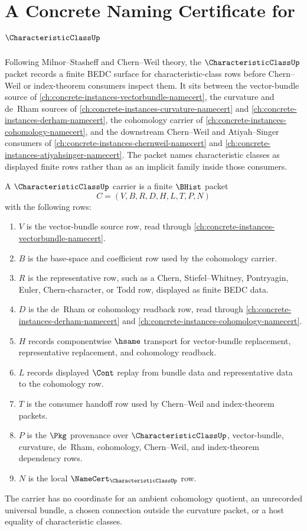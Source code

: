 \chapter{A Concrete Naming Certificate for $\CharacteristicClassUp$}
\label{ch:concrete-instances-characteristic-class-namecert}

Following Milnor--Stasheff and Chern--Weil theory, the $\CharacteristicClassUp$ packet records a finite BEDC surface for characteristic-class rows before Chern--Weil or index-theorem consumers inspect them. It sits between the vector-bundle source of \autoref{ch:concrete-instances-vectorbundle-namecert}, the curvature and de~Rham sources of \autoref{ch:concrete-instances-curvature-namecert} and \autoref{ch:concrete-instances-derham-namecert}, the cohomology carrier of \autoref{ch:concrete-instances-cohomology-namecert}, and the downstream Chern--Weil and Atiyah--Singer consumers of \autoref{ch:concrete-instances-chernweil-namecert} and \autoref{ch:concrete-instances-atiyahsinger-namecert}. The packet names characteristic classes as displayed finite rows rather than as an implicit family inside those consumers.

\begin{definition}
\label{def:characteristic-class-carrier}
A $\CharacteristicClassUp$ carrier is a finite $\BHist$ packet
$$
C=(V,B,R,D,H,L,T,P,N)
$$
with the following rows:
\begin{enumerate}
\item $V$ is the vector-bundle source row, read through \autoref{ch:concrete-instances-vectorbundle-namecert}.
\item $B$ is the base-space and coefficient row used by the cohomology carrier.
\item $R$ is the representative row, such as a Chern, Stiefel--Whitney, Pontryagin, Euler, Chern-character, or Todd row, displayed as finite BEDC data.
\item $D$ is the de~Rham or cohomology readback row, read through \autoref{ch:concrete-instances-derham-namecert} and \autoref{ch:concrete-instances-cohomology-namecert}.
\item $H$ records componentwise $\hsame$ transport for vector-bundle replacement, representative replacement, and cohomology readback.
\item $L$ records displayed $\Cont$ replay from bundle data and representative data to the cohomology row.
\item $T$ is the consumer handoff row used by Chern--Weil and index-theorem packets.
\item $P$ is the $\Pkg$ provenance over $\CharacteristicClassUp$, vector-bundle, curvature, de~Rham, cohomology, Chern--Weil, and index-theorem dependency rows.
\item $N$ is the local $\NameCert_{\CharacteristicClassUp}$ row.
\end{enumerate}
The carrier has no coordinate for an ambient cohomology quotient, an unrecorded universal bundle, a chosen connection outside the curvature packet, or a host equality of characteristic classes.
\end{definition}

